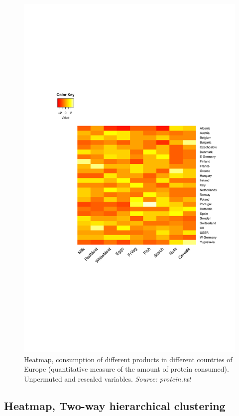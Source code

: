 \documentclass[11pt]{article}
\begin{document}
\begin{figure}[H]
  \centering
    \includegraphics[scale = 0.6]{heatmap_1_2.pdf}
   \caption{Heatmap, consumption of different products in different countries of Europe (quantitative measure of the amount of protein consumed). Unpermuted and rescaled variables. \textit{Source: protein.txt} }
   \label{fig:heat_1_2}
\end{figure}


\subsection*{Heatmap, Two-way hierarchical clustering}
\end{document}
